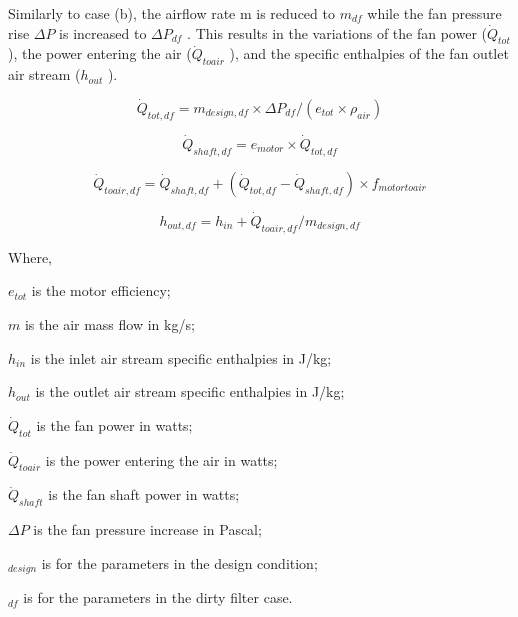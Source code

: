 Similarly to case (b), the airflow rate m is reduced to \(m_{df}\) while the fan pressure rise \(\Delta P\) is increased to \(\Delta P_{df}\) . This results in the variations of the fan power (\(\dot Q_{tot}\) ), the power entering the air (\(\dot Q_{toair}\) ), and the specific enthalpies of the fan outlet air stream (\(h_{out}\) ).

\begin{equation}
\dot{Q}_{tot,df} = m_{design,df} \times \Delta P_{df} / (e_{tot} \times \rho_{air} )
\end{equation}

\begin{equation}
\dot{Q}_{shaft,df} = e_{motor} \times \dot{Q}_{tot, df}
\end{equation}

\begin{equation}
\dot{Q}_{toair,df} = \dot{Q}_{shaft,df} +( \dot{Q}_{tot,df} - \dot{Q}_{shaft,df}) \times f_{motortoair}
\end{equation}

\begin{equation}
h_{out,df} = h_{in} + \dot{Q}_{toair,df} / m_{design,df}
\end{equation}

Where,

\(e_{tot}\) is the motor efficiency;

\(m\) is the air mass flow in kg/s;

\(h_{in}\) is the inlet air stream specific enthalpies in J/kg;

\(h_{out}\) is the outlet air stream specific enthalpies in J/kg;

\(\dot{Q}_{tot}\) is the fan power in watts;

\(\dot{Q}_{toair}\) is the power entering the air in watts;

\(\dot{Q}_{shaft}\) is the fan shaft power in watts;

\(\Delta P\) is the fan pressure increase in Pascal;

\(_{design}\) is for the parameters in the design condition;

\(_{df}\) is for the parameters in the dirty filter case.
